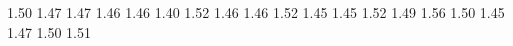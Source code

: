 1.50 1.47
1.47 1.46
1.46 1.40
1.52 1.46
1.46 1.52
1.45 1.45
1.52 1.49
1.56 1.50
1.45 1.47
1.50 1.51
